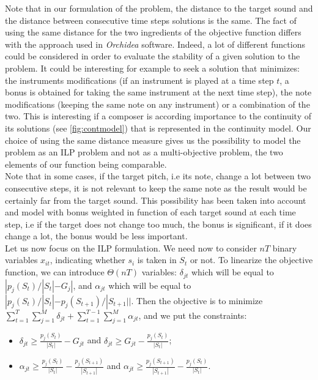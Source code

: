 \documentclass[a4paper]{book}
\begin{document}
Note that in our formulation of the problem, the distance to the target sound and the distance between consecutive time steps solutions is the same. The fact of using the same distance for the two ingredients of the objective function differs with the approach used in \textit{Orchidea} software. Indeed, a lot of different functions could be considered in order to evaluate the stability of a given solution to the problem. It could be interesting for example to seek a solution that minimizes: the instruments modifications (if an instrument is played at a time step $t$, a bonus is obtained for taking the same instrument at the next time step), the note modifications (keeping the same note on any instrument) or a combination of the two. This is interesting if a composer is according importance to the continuity of its solutions (see \ref{fig:contmodel}) that is represented in the continuity model. Our choice of using the same distance measure gives us the possibility to model the problem as an ILP problem and not as a multi-objective problem, the two elements of our function being comparable. \\
Note that in some cases, if the target pitch, i.e its note, change a lot between two consecutive steps, it is not relevant to keep the same note as the result would be certainly far from the target sound. This possibility has been taken into account and model with bonus weighted in function of each target sound at each time step, i.e if the target does not change too much, the bonus is significant, if it does change a lot, the bonus would be less important.\\




Let us now focus on the ILP formulation. We need now to consider $nT$ binary variables $x_{it}$, indicating whether $s_i$ is taken in $S_t$ or not. To linearize the objective function, we can introduce $\Theta(nT)$ variables: $\delta_{jt}$ which will be equal to $|p_j(S_t)/|S_t|-G_j|$, and $\alpha_{jt}$ which will be equal to $|p_j(S_t)/|S_t|-p_j(S_{t+1})/|S_{t+1}||$. Then the objective is to minimize $\sum_{t=1}^T\sum_{j=1}^M \delta_{jt}+ \sum_{t=1}^{T-1}\sum_{j=1}^M \alpha_{jt}$, and we put the constraints:
\begin{itemize}
    \item $\delta_{jt}\geq \frac{p_j(S_t)}{|S_t|}-G_{jt}$ and $\delta_{jt}\geq G_{jt}-\frac{p_j(S_t)}{|S_t|}$;
    \item $\alpha_{jt}\geq \frac{p_j(S_t)}{|S_t|}-\frac{p_j(S_{t+1})}{|S_{t+1}|}$ and $\alpha_{jt}\geq \frac{p_j(S_{t+1})}{|S_{t+1}|}-\frac{p_j(S_t)}{|S_t|}$.
\end{itemize}
\end{document}
